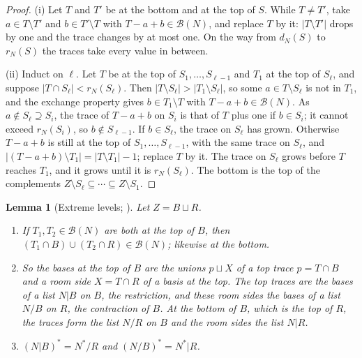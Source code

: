\documentclass[11pt]{article}
\theoremstyle{plain}
\newtheorem{lemma}[prop]{Lemma}
\theoremstyle{definition}
\theoremstyle{remark}
\newcommand{\cB}{\mathcal B}
\begin{document}
\begin{proof}
(i) Let $T$ and $T'$ be at the bottom and at the top of $S$. While $T\neq T'$, take $a\in T\setminus T'$ and $b\in T'\setminus T$ with $T-a+b\in\cB(N)$, and replace $T$ by it: $|T\setminus T'|$ drops by one and the trace changes by at most one. On the way from $d_N(S)$ to $r_N(S)$ the traces take every value in between.

(ii) Induct on $\ell$. Let $T$ be at the top of $S_1,\dots,S_{\ell-1}$ and $T_1$ at the top of $S_\ell$, and suppose $|T\cap S_\ell|<r_N(S_\ell)$. Then $|T\setminus S_\ell|>|T_1\setminus S_\ell|$, so some $a\in T\setminus S_\ell$ is not in $T_1$, and the exchange property gives $b\in T_1\setminus T$ with $T-a+b\in\cB(N)$. As $a\notin S_\ell\supseteq S_i$, the trace of $T-a+b$ on $S_i$ is that of $T$ plus one if $b\in S_i$; it cannot exceed $r_N(S_i)$, so $b\notin S_{\ell-1}$. If $b\in S_\ell$, the trace on $S_\ell$ has grown. Otherwise $T-a+b$ is still at the top of $S_1,\dots,S_{\ell-1}$, with the same trace on $S_\ell$, and $|(T-a+b)\setminus T_1|=|T\setminus T_1|-1$; replace $T$ by it. The trace on $S_\ell$ grows before $T$ reaches $T_1$, and it grows until it is $r_N(S_\ell)$. The bottom is the top of the complements $Z\setminus S_\ell\subseteq\cdots\subseteq Z\setminus S_1$.
\end{proof}

\begin{lemma}[Extreme levels; {\cite[Def.~7.5, p.~49; Thm.~12.17, p.~73]{F}}]\label{lem:extreme}
Let $Z=B\sqcup R$.
\begin{enumerate}[label=(\roman*)]
\item If $T_1,T_2\in\cB(N)$ are both at the top of $B$, then $(T_1\cap B)\cup(T_2\cap R)\in\cB(N)$; likewise at the bottom.
\item So the bases at the top of $B$ are the unions $p\sqcup X$ of a \emph{top trace} $p=T\cap B$ and a room side $X=T\cap R$ of a basis at the top. The top traces are the bases of a list $N|B$ on $B$, the \emph{restriction}, and these room sides the bases of a list $N/B$ on $R$, the \emph{contraction} of $B$. At the bottom of $B$, which is the top of $R$, the traces form the list $N/R$ on $B$ and the room sides the list $N|R$.
\item $(N|B)^\ast=N^\ast/R$ and $(N/B)^\ast=N^\ast|R$.
\end{enumerate}
\end{lemma}
\end{document}
